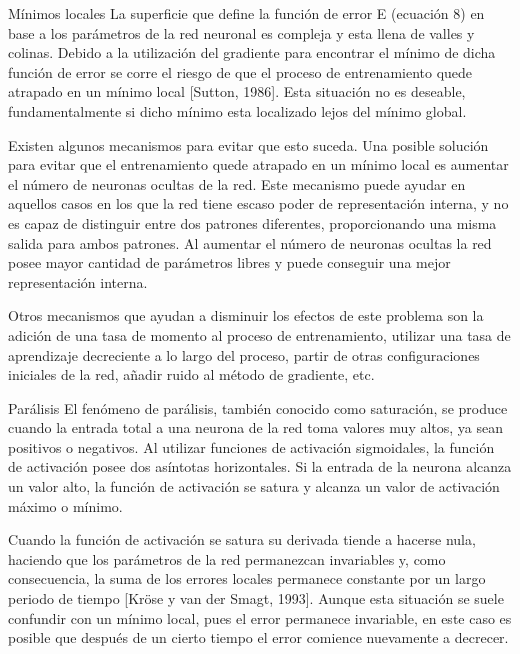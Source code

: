 \documentclass[11pt]{article}
\begin{document}
\begin{titlepage}
\begin{listaDefiniciones}
\item[M\'inimos locales] La superficie que define la funci\'on de error E (ecuaci\'on 8) en base a los par\'ametros de la red neuronal es compleja y esta llena de valles y colinas. Debido a la utilizaci\'on del gradiente para encontrar el m\'inimo de dicha funci\'on de error se corre el riesgo de que el proceso de entrenamiento quede atrapado en un m\'inimo local [Sutton, 1986]. Esta situaci\'on no es deseable, fundamentalmente si dicho m\'inimo esta localizado lejos del m\'inimo global.

 Existen algunos mecanismos para evitar que esto suceda. Una posible soluci\'on para evitar que el entrenamiento quede atrapado en un m\'inimo local es aumentar el n\'umero de neuronas ocultas de la red. Este mecanismo puede ayudar en aquellos casos en los que la red tiene escaso poder de representaci\'on interna, y no es capaz de distinguir entre dos patrones diferentes, proporcionando una misma salida para ambos patrones. Al aumentar el n\'umero de neuronas ocultas la red posee mayor cantidad de par\'ametros libres y puede conseguir una mejor representaci\'on interna.

 Otros mecanismos que ayudan a disminuir los efectos de este problema son la adici\'on de una tasa de momento al proceso de entrenamiento, utilizar una tasa de aprendizaje decreciente a lo largo del proceso, partir de otras configuraciones iniciales de la red, a\~nadir ruido al m\'etodo de gradiente, etc.

\item[Par\'alisis] El fen\'omeno de par\'alisis, tambi\'en conocido como saturaci\'on, se produce cuando la entrada total a una neurona de la red toma valores muy altos, ya sean positivos o negativos. Al utilizar funciones de activaci\'on sigmoidales, la funci\'on de activaci\'on posee dos as\'intotas horizontales. Si la entrada de la neurona alcanza un valor alto, la funci\'on de activaci\'on se satura y alcanza un valor de activaci\'on m\'aximo o m\'inimo.

 Cuando la funci\'on de activaci\'on se satura su derivada tiende a hacerse nula, haciendo que los par\'ametros de la red permanezcan invariables y, como consecuencia, la suma de los errores locales permanece constante por un largo periodo de tiempo [Kr\"ose y van der Smagt, 1993]. Aunque esta situaci\'on se suele confundir con un m\'inimo local, pues el error permanece invariable, en este caso es posible que despu\'es de un cierto tiempo el error comience nuevamente a decrecer.


\end{listaDefiniciones}
\end{titlepage}
\end{document}
